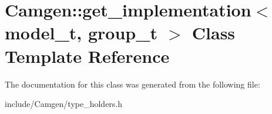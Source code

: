 \hypertarget{a00248}{}\section{Camgen\+:\+:get\+\_\+implementation$<$ model\+\_\+t, group\+\_\+t $>$ Class Template Reference}
\label{a00248}


The documentation for this class was generated from the following file\+:\begin{DoxyCompactItemize}
\item 
include/\+Camgen/type\+\_\+holders.\+h\end{DoxyCompactItemize}
